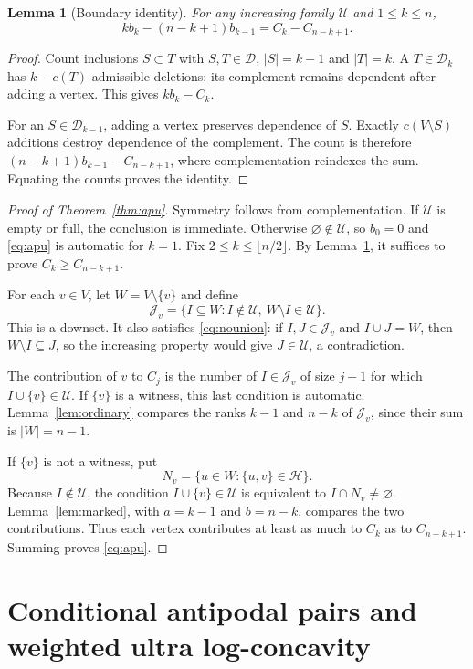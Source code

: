 \documentclass[11pt,a4paper]{article}
\newtheorem{lemma}[theorem]{Lemma}
\theoremstyle{remark}
\newcommand{\U}{\mathcal U}
\newcommand{\J}{\mathcal J}
\newcommand{\D}{\mathcal D}
\begin{document}
\begin{lemma}[Boundary identity]\label{lem:boundary}
For any increasing family $\U$ and $1\leq k\leq n$,
\begin{equation}\label{eq:boundary}
k b_k-(n-k+1)b_{k-1}=C_k-C_{n-k+1}.
\end{equation}
\end{lemma}
\begin{proof}
Count inclusions $S\subset T$ with $S,T\in\D$, $|S|=k-1$ and $|T|=k$. A $T\in\D_k$ has $k-c(T)$ admissible deletions: its complement remains dependent after adding a vertex. This gives $k b_k-C_k$.

For an $S\in\D_{k-1}$, adding a vertex preserves dependence of $S$. Exactly $c(V\setminus S)$ additions destroy dependence of the complement. The count is therefore $(n-k+1)b_{k-1}-C_{n-k+1}$, where complementation reindexes the sum. Equating the counts proves the identity.
\end{proof}

\begin{proof}[Proof of Theorem~\ref{thm:apu}]
Symmetry follows from complementation. If $\U$ is empty or full, the conclusion is immediate. Otherwise $\varnothing\notin\U$, so $b_0=0$ and \eqref{eq:apu} is automatic for $k=1$. Fix $2\leq k\leq\lfloor n/2\rfloor$. By Lemma~\ref{lem:boundary}, it suffices to prove $C_k\geq C_{n-k+1}$.

For each $v\in V$, let $W=V\setminus\{v\}$ and define
\[
\J_v=\{I\subseteq W:I\notin\U,\ W\setminus I\in\U\}.
\]
This is a downset. It also satisfies \eqref{eq:nounion}: if $I,J\in\J_v$ and $I\cup J=W$, then $W\setminus I\subseteq J$, so the increasing property would give $J\in\U$, a contradiction.

The contribution of $v$ to $C_j$ is the number of $I\in\J_v$ of size $j-1$ for which $I\cup\{v\}\in\U$. If $\{v\}$ is a witness, this last condition is automatic. Lemma~\ref{lem:ordinary} compares the ranks $k-1$ and $n-k$ of $\J_v$, since their sum is $|W|=n-1$.

If $\{v\}$ is not a witness, put
\[
N_v=\{u\in W:\{u,v\}\in\mathcal H\}.
\]
Because $I\notin\U$, the condition $I\cup\{v\}\in\U$ is equivalent to $I\cap N_v\ne\varnothing$. Lemma~\ref{lem:marked}, with $a=k-1$ and $b=n-k$, compares the two contributions. Thus each vertex contributes at least as much to $C_k$ as to $C_{n-k+1}$. Summing proves \eqref{eq:apu}.
\end{proof}

\section{Conditional antipodal pairs and weighted ultra log-concavity}
\end{document}
